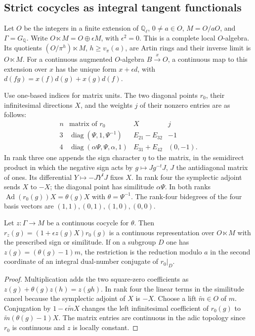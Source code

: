 \subsection{Strict cocycles as integral tangent functionals}
\label{ct:section}

Let \(O\) be the integers in a finite extension of \(\mathbb Q_\ell\),
\(0\ne a\in O\), \(M=O/aO\), and \(\Gamma=G_{\mathbb Q}\).
Write \(O\ltimes M=O\oplus\epsilon M\), with \(\epsilon^2=0\).
This is a complete local \(O\)-algebra. Its quotients
\((O/\pi^h)\ltimes M\), \(h\ge v_\pi(a)\), are Artin rings and their
inverse limit is \(O\ltimes M\). For a continuous augmented
\(O\)-algebra \(B\xrightarrow{x}O\), a continuous map to this
extension over \(x\) has the unique form \(x+\epsilon d\), with
\(d(fg)=x(f)d(g)+x(g)d(f)\).

Use one-based indices for matrix units. The two diagonal points
\(r_0\), their infinitesimal directions \(X\), and the weights \(j\)
of their nonzero entries are as follows:
\[
\begin{array}{c|c|c|c}
 n&\text{matrix of }r_0& X& j\\ \hline
 3&\operatorname{diag}(\Psi,1,\Psi^{-1})&E_{21}-E_{32}&-1\\
 4&\operatorname{diag}(\alpha\Psi,\Psi,\alpha,1)&E_{31}+E_{42}&(0,-1).
\end{array}
\]
In rank three one appends the sign character \(\eta\) to the matrix,
in the semidirect product in which the negative sign acts by
\(g\mapsto Jg^{-t}J\), \(J\) the antidiagonal matrix of ones. Its
differential \(Y\mapsto-JY^tJ\) fixes \(X\).
In rank four the symplectic adjoint sends \(X\) to \(-X\);
the diagonal point has similitude \(\alpha\Psi\).
In both ranks \(\operatorname{Ad}(r_0(g))X=\theta(g)X\) with
\(\theta=\Psi^{-1}\). The rank-four bidegrees of the four basis
vectors are \((1,1),(0,1),(1,0),(0,0)\).

\begin{proposition}\label{ct:point}
Let \(z:\Gamma\to M\) be a continuous cocycle for \(\theta\).
Then \(r_z(g)=(1+\epsilon z(g)X)r_0(g)\) is a continuous
representation over \(O\ltimes M\) with the prescribed sign or
similitude. If on a subgroup \(D\) one has
\(z(g)=(\theta(g)-1)m\), the restriction is the reduction modulo \(a\)
in the second coordinate of an integral dual-number conjugate of
\(r_0|_D\).
\end{proposition}
\begin{proof}
Multiplication adds the two square-zero coefficients as
\(z(g)+\theta(g)z(h)=z(gh)\). In rank four the linear terms in the
similitude cancel because the symplectic adjoint of \(X\) is \(-X\).
Choose a lift \(\widetilde m\in O\) of \(m\). Conjugation by
\(1-\epsilon\widetilde mX\) changes the left infinitesimal coefficient
of \(r_0(g)\) to \(\widetilde m(\theta(g)-1)X\).
The matrix entries are continuous in the adic topology since \(r_0\)
is continuous and \(z\) is locally constant.
\end{proof}

